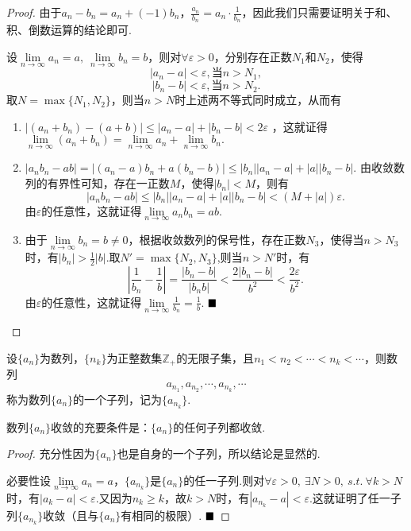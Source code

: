 \begin{proof}
	由于$a_n-b_n=a_n+(-1)b_n$，$\frac{a_n}{b_n}=a_n\cdot \frac{1}{b_n}$，因此我们只需要证明关于和、积、倒数运算的结论即可.
	
	设$\lim\limits_{n\to\infty}a_n=a,\ \lim\limits_{n\to\infty}b_n=b$，则对$\forall\varepsilon>0$，分别存在正数$N_1$和$N_2$，使得
	$$|a_n-a|<\varepsilon,\mbox{当}n>N_1,$$
	$$|b_n-b|<\varepsilon,\mbox{当}n>N_2.$$
	取$N=\max\{N_1,N_2\}$，则当$n>N$时上述两不等式同时成立，从而有
	\begin{enumerate}
		\item 	$|(a_n+b_n)-(a+b)|\leqslant |a_n-a|+|b_n-b|<2\varepsilon$
		，这就证得$\lim\limits_{n\to\infty}(a_n+b_n)=\lim\limits_{n\to\infty}a_n+\lim\limits_{n\to\infty}b_n.$
		\item	$|a_nb_n-ab|=|(a_n-a)b_n+a(b_n-b)|\leqslant |b_n||a_n-a|+|a||b_n-b|.$
		由收敛数列的有界性可知，存在一正数$M$，使得$|b_n|<M$，则有
		$$|a_nb_n-ab|\leqslant |b_n||a_n-a|+|a||b_n-b|<(M+|a|)\varepsilon.$$
		由$\varepsilon$的任意性，这就证得$\lim\limits_{n\to\infty}a_nb_n=ab.$
		\item  由于$\lim\limits_{n\to\infty}b_n=b\neq 0$，根据收敛数列的保号性，存在正数$N_3$，使得当$n>N_3$时，有$|b_n|>\frac{1}{2}|b|$.取$N'=\max\{N_2,N_3\}$,则当$n>N'$时，有
		$$\left|\frac{1}{b_n}-\frac{1}{b}\right|=\frac{|b_n-b|}{|b_n b|}<\frac{2|b_n-b|}{b^2}<\frac{2\varepsilon}{b^2}.$$
		由$\varepsilon$的任意性，这就证得$\lim\limits_{n\to\infty}\frac{1}{b_n}=\frac{1}{b}.$
		$\hfill\blacksquare$
	\end{enumerate}
\end{proof}
\begin{definition}[子列]
	设$\{a_n\}$为数列，$\{n_k\}$为正整数集$\mathbb{Z}_+$的无限子集，且$n_1<n_2<\cdots <n_k<\cdots$，则数列
	$$a_{n_1},a_{n_2},\cdots,a_{n_k},\cdots$$
	称为数列$\{a_n\}$的一个子列，记为$\{a_{n_k}\}$.
\end{definition}
\begin{theorem}
	数列$\{a_n\}$收敛的充要条件是：$\{a_n\}$的任何子列都收敛.
\end{theorem}
\begin{proof}
	充分性\qquad 因为$\{a_n\}$也是自身的一个子列，所以结论是显然的.
	
	必要性\qquad 设$\lim\limits_{n\to \infty}a_n=a$，$\{a_{n_k}\}$是$\{a_n\}$的任一子列.则对$\forall \varepsilon>0,\ \exists N>0,\ s.t.\ \forall k>N$时，有$|a_k-a|<\varepsilon$.又因为$n_k\geqslant k$，故$k>N$时，有$|a_{n_k}-a|<\varepsilon$.这就证明了任一子列$\{a_{n_k}\}$收敛（且与$\{a_n\}$有相同的极限）.
	$\hfill\blacksquare$
\end{proof}
